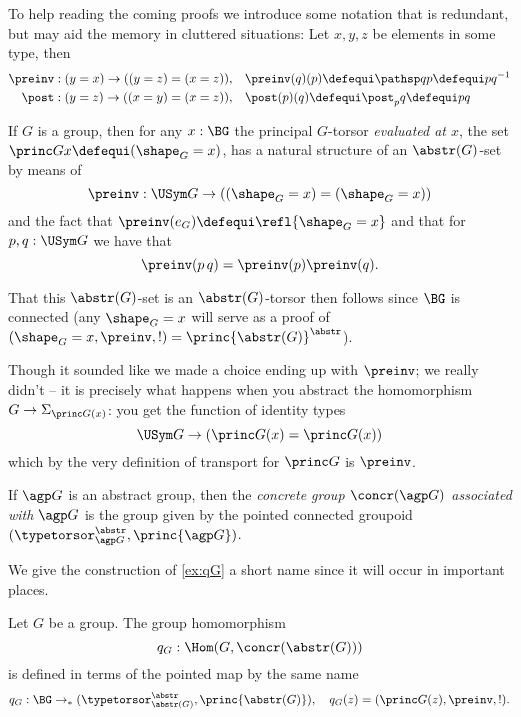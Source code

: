 To help reading the coming proofs we introduce some notation that is redundant, but may aid the memory in cluttered situations:  Let $x,y,z$ be elements in some type, then
\begin{align*}
  \preinv:(y=x)\to ((y=z)=(x=z)),\quad&\preinv(q)(p)\defequi\pathsp qp\defequi pq^{-1}\\
  \post:(y=z)\to ((x=y)=(x=z)),\quad&\post(p)(q)\defequi\post_pq\defequi pq\\
\end{align*}


\begin{example}\label{ex:qG}
  If $G$ is a group, then for any $x:\BG$ the principal $G$-torsor \emph{evaluated at $x$}, \ie the set $\princ Gx\defequi(\shape_G=x)$, has a natural structure of an $\abstr(G)$-set by means of
  $$\preinv:\USym G\to ((\shape_G=x)=(\shape_G=x))$$ and the fact that $\preinv(e_G)\defequi\refl{\shape_G=x}$ and that for $p,q:\USym G$ we have that
  $$\preinv(p\,q)=\preinv(p)\preinv(q).$$


That this $\abstr(G)$-set is an $\abstr(G)$-torsor then follows since $\BG$ is connected (any $\shape_G=x$ will serve as a proof of $(\shape_G=x,\preinv,!)=\princ{\abstr(G)}^\abstr$).

Though it sounded like we made a choice ending up with $\preinv$; we really didn't -- it is precisely what happens when you abstract the homomorphism $G\to\Sigma_{\princ G(x)}$:
you get the function of identity types
$$\USym G\to (\princ G(x)=\princ G(x))$$
which by the very definition of transport for $\princ G$ is $\preinv$.
\end{example}

\begin{definition}
  If ${\agp G}$ is an abstract group, then the \emph{concrete group $\concr({\agp G})$ associated with ${\agp G}$} is the group given by the pointed connected groupoid $(\typetorsor_{\agp G}^\abstr,\princ {\agp G})$.
\end{definition}
We give the construction of \cref{ex:qG} a short name since it will occur in important places.
\begin{definition}
  Let $G$ be a group.
  The group homomorphism
  $$q_G:\Hom(G,\concr(\abstr(G)))$$
  is defined in terms of the pointed map by the same name
$$q_G:\BG\to_* (\typetorsor^\abstr_{\abstr(G)},\princ {\abstr(G)}),\quad q_G(z)=(\princ G(z),\preinv,!).$$
\end{definition}

